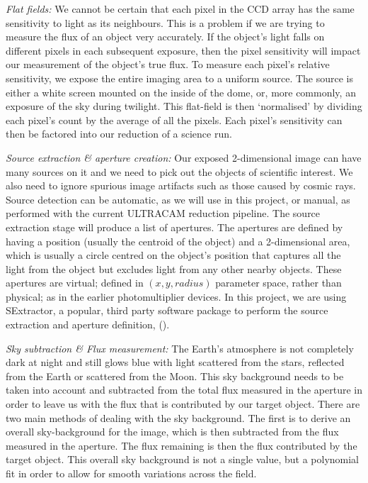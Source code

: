 \emph{Flat fields:}
We cannot be certain that each pixel in the CCD array has the same sensitivity to light as its neighbours. This is a problem if we are trying to measure the flux of an object very accurately. If the object's light falls on different pixels in each subsequent exposure, then the pixel sensitivity will impact our measurement of the object's true flux. To measure each pixel's relative sensitivity, we expose the entire imaging area to a uniform source. The source is either a white screen mounted on the inside of the dome, or, more commonly, an exposure of the sky during twilight. This flat-field is then `normalised' by dividing each pixel's count by the average of all the pixels. Each pixel's sensitivity can then be factored into our reduction of a science run. 

\emph{Source extraction \& aperture creation:}
Our exposed 2-dimensional image can have many sources on it and we need to pick out the objects of scientific interest. We also need to ignore spurious image artifacts such as those caused by cosmic rays. Source detection can be automatic, as we will use in this project, or manual, as performed with the current ULTRACAM reduction pipeline. The source extraction stage will produce a list of apertures. The apertures are defined by having a position (usually the centroid of the object) and a 2-dimensional area, which is usually a circle centred on the object's position that captures all the light from the object but excludes light from any other nearby objects. These apertures are virtual; defined in $(x, y, radius)$ parameter space, rather than physical; as in the earlier photomultiplier devices. In this project, we are using {SExtractor}, a popular, third party software package to perform the source extraction and aperture definition, (\cite{bertin}).

\emph{Sky subtraction \& Flux measurement:}
The Earth's atmosphere is not completely dark at night and still glows blue with light scattered from the stars, reflected from the Earth or scattered from the Moon. This sky background needs to be taken into account and subtracted from the total flux measured in the aperture in order to leave us with the flux that is contributed by our target object. There are two main methods of dealing with the sky background. The first is to derive an overall sky-background for the image, which is then subtracted from the flux measured in the aperture. The flux remaining is then the flux contributed by the target object. This overall sky background is not a single value, but a polynomial fit in order to allow for smooth variations across the field. 


